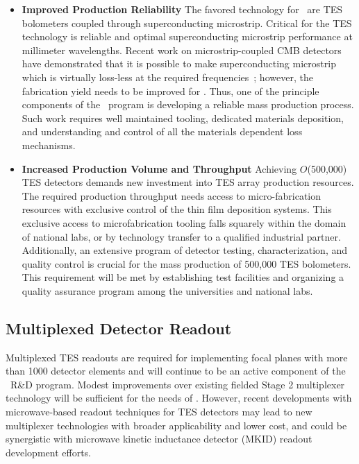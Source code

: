 \begin{itemize}

\item {\bf Improved Production Reliability} The favored technology for
  \cmbexp\ are TES bolometers coupled through superconducting
  microstrip. Critical for the TES technology is reliable and optimal
  superconducting microstrip performance at millimeter
  wavelengths. Recent work on microstrip-coupled CMB detectors have
  demonstrated that it is possible to make superconducting microstrip
  which is virtually loss-less at the required
  frequencies~\cite{Henning:2012fz}; however, the fabrication yield needs
  to be improved for \cmbexp. Thus, one of the principle components of
  the \cmbexp\ program is developing a reliable mass production
  process. Such work requires well maintained tooling, dedicated
  materials deposition, and understanding and control of all the
  materials dependent loss mechanisms.


\item {\bf Increased Production Volume and Throughput} Achieving
  $O$(500,000) TES detectors demands new investment into TES array
  production resources. The required production throughput needs
  access to micro-fabrication resources with exclusive control of the
  thin film deposition systems. This exclusive access to
  microfabrication tooling falls squarely within the domain of
  national labs, or by technology transfer to a qualified industrial partner. Additionally, an extensive program of detector
  testing, characterization, and quality control is crucial for the
  mass production of 500,000 TES bolometers. This requirement will be
  met by establishing test facilities and organizing a quality
  assurance program among the universities and national labs.

\end{itemize}



\subsection{Multiplexed Detector Readout}

 Multiplexed TES readouts are
  required for implementing focal planes with more than 1000 detector
  elements and will continue to be an active component of the
  \cmbexp\ R\&D program. Modest improvements over existing fielded
  Stage 2 multiplexer technology will be sufficient for the needs of
  \cmbexp. However, recent developments with microwave-based readout
  techniques for TES detectors may lead to new multiplexer technologies
  with broader applicability and lower cost, and could be synergistic
  with microwave kinetic inductance detector (MKID) readout development efforts.   


